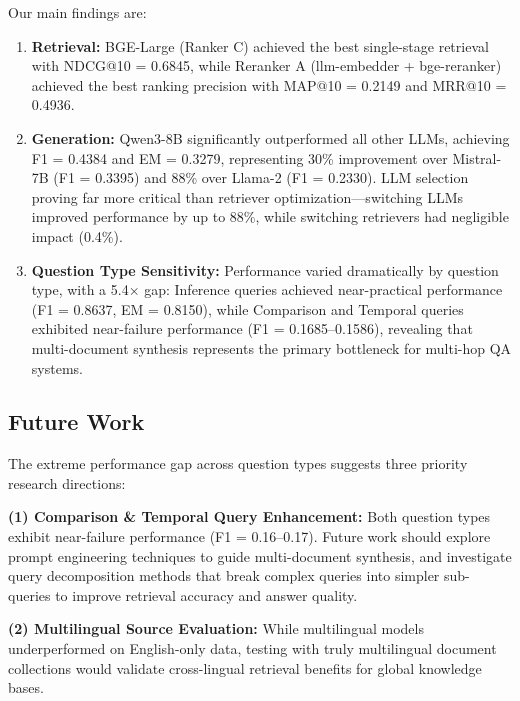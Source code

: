 \documentclass[10pt,twocolumn]{article}
\begin{document}
Our main findings are:
\begin{enumerate}[leftmargin=*, itemsep=0pt]
    \item \textbf{Retrieval:} BGE-Large (Ranker C) achieved the best single-stage retrieval with NDCG@10 = 0.6845, while Reranker A (llm-embedder + bge-reranker) achieved the best ranking precision with MAP@10 = 0.2149 and MRR@10 = 0.4936.
    \item \textbf{Generation:} Qwen3-8B significantly outperformed all other LLMs, achieving F1 = 0.4384 and EM = 0.3279, representing 30\% improvement over Mistral-7B (F1 = 0.3395) and 88\% over Llama-2 (F1 = 0.2330). LLM selection proving far more critical than retriever optimization---switching LLMs improved performance by up to 88\%, while switching retrievers had negligible impact (0.4\%).
    \item \textbf{Question Type Sensitivity:} Performance varied dramatically by question type, with a 5.4× gap: Inference queries achieved near-practical performance (F1 = 0.8637, EM = 0.8150), while Comparison and Temporal queries exhibited near-failure performance (F1 = 0.1685--0.1586), revealing that multi-document synthesis represents the primary bottleneck for multi-hop QA systems.
\end{enumerate}

\subsection{Future Work}

The extreme performance gap across question types suggests three priority research directions:

\textbf{(1) Comparison \& Temporal Query Enhancement:} Both question types exhibit near-failure performance (F1 = 0.16--0.17). Future work should explore prompt engineering techniques to guide multi-document synthesis, and investigate query decomposition methods that break complex queries into simpler sub-queries to improve retrieval accuracy and answer quality.

\textbf{(2) Multilingual Source Evaluation:} While multilingual models underperformed on English-only data, testing with truly multilingual document collections would validate cross-lingual retrieval benefits for global knowledge bases.



\end{document}
